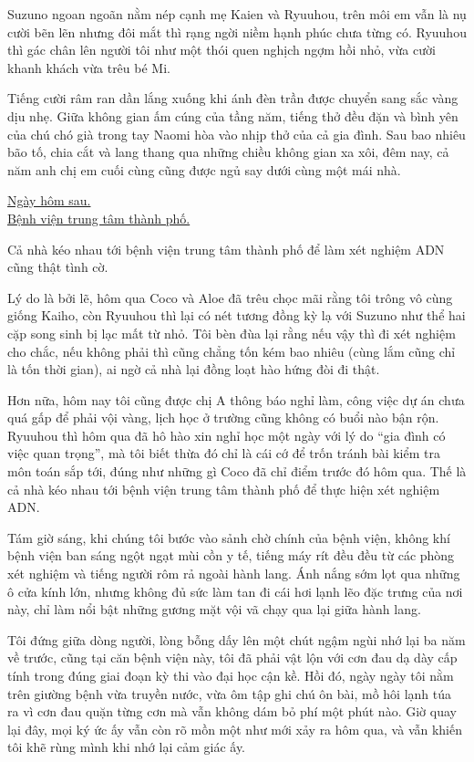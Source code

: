 ﻿\documentclass[../main.tex]{subfiles}
\begin{document}
Suzuno ngoan ngoãn nằm nép cạnh mẹ Kaien và Ryuuhou, trên môi em vẫn là nụ cười bẽn lẽn nhưng đôi mắt thì rạng ngời niềm hạnh phúc chưa từng có. Ryuuhou thì gác chân lên người tôi như một thói quen nghịch ngợm hồi nhỏ, vừa cười khanh khách vừa trêu bé Mi.

Tiếng cười râm ran dần lắng xuống khi ánh đèn trần được chuyển sang sắc vàng dịu nhẹ. Giữa không gian ấm cúng của tầng năm, tiếng thở đều đặn và bình yên của chú chó già trong tay Naomi hòa vào nhịp thở của cả gia đình. Sau bao nhiêu bão tố, chia cắt và lang thang qua những chiều không gian xa xôi, đêm nay, cả năm anh chị em cuối cùng cũng được ngủ say dưới cùng một mái nhà.

\begin{center}
    \uline{Ngày hôm sau.\\Bệnh viện trung tâm thành phố.}
\end{center}

Cả nhà kéo nhau tới bệnh viện trung tâm thành phố để làm xét nghiệm ADN cũng thật tình cờ.

Lý do là bởi lẽ, hôm qua Coco và Aloe đã trêu chọc mãi rằng tôi trông vô cùng giống Kaiho, còn Ryuuhou thì lại có nét tương đồng kỳ lạ với Suzuno như thể hai cặp song sinh bị lạc mất từ nhỏ. Tôi bèn đùa lại rằng nếu vậy thì đi xét nghiệm cho chắc, nếu không phải thì cũng chẳng tốn kém bao nhiêu (cùng lắm cũng chỉ là tốn thời gian), ai ngờ cả nhà lại đồng loạt hào hứng đòi đi thật.

Hơn nữa, hôm nay tôi cũng được chị A thông báo nghỉ làm, công việc dự án chưa quá gấp để phải vội vàng, lịch học ở trường cũng không có buổi nào bận rộn. Ryuuhou thì hôm qua đã hô hào xin nghỉ học một ngày với lý do ``gia đình có việc quan trọng'', mà tôi biết thừa đó chỉ là cái cớ để trốn tránh bài kiểm tra môn toán sắp tới, đúng như những gì Coco đã chỉ điểm trước đó hôm qua. Thế là cả nhà kéo nhau tới bệnh viện trung tâm thành phố để thực hiện xét nghiệm ADN.

Tám giờ sáng, khi chúng tôi bước vào sảnh chờ chính của bệnh viện, không khí bệnh viện ban sáng ngột ngạt mùi cồn y tế, tiếng máy rít đều đều từ các phòng xét nghiệm và tiếng người rôm rả ngoài hành lang. Ánh nắng sớm lọt qua những ô cửa kính lớn, nhưng không đủ sức làm tan đi cái hơi lạnh lẽo đặc trưng của nơi này, chỉ làm nổi bật những gương mặt vội vã chạy qua lại giữa hành lang.

Tôi đứng giữa dòng người, lòng bỗng dấy lên một chút ngậm ngùi nhớ lại ba năm về trước, cũng tại căn bệnh viện này, tôi đã phải vật lộn với cơn đau dạ dày cấp tính trong đúng giai đoạn kỳ thi vào đại học cận kề. Hồi đó, ngày ngày tôi nằm trên giường bệnh vừa truyền nước, vừa ôm tập ghi chú ôn bài, mồ hôi lạnh túa ra vì cơn đau quặn từng cơn mà vẫn không dám bỏ phí một phút nào. Giờ quay lại đây, mọi ký ức ấy vẫn còn rõ mồn một như mới xảy ra hôm qua, và vẫn khiến tôi khẽ rùng mình khi nhớ lại cảm giác ấy.
\end{document}
